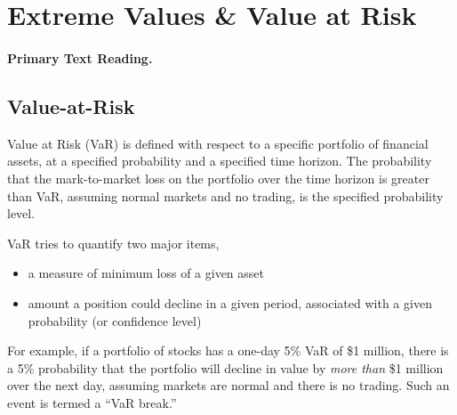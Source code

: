 \section{Extreme Values \& Value at Risk}
\paragraph{Primary Text Reading.} 

\subsection{Value-at-Risk}
Value at Risk (VaR) is defined with respect to a specific portfolio of financial assets, at a specified probability and a specified time horizon. The probability that the mark-to-market loss on the portfolio over the time horizon is greater than VaR, assuming normal markets and no trading, is the specified probability level.

VaR tries to quantify two major items,
\begin{itemize}
\item a measure of minimum loss of a given asset
\item amount a position could decline in a given period, associated with a given probability (or confidence level)
\end{itemize}

For example, if a portfolio of stocks has a one-day 5\% VaR of \$1 million, there is a 5\% probability that the portfolio will decline in value by \emph{more than} \$1 million over the next day, assuming markets are normal and there is no trading. Such an event is termed a ``VaR break.''

